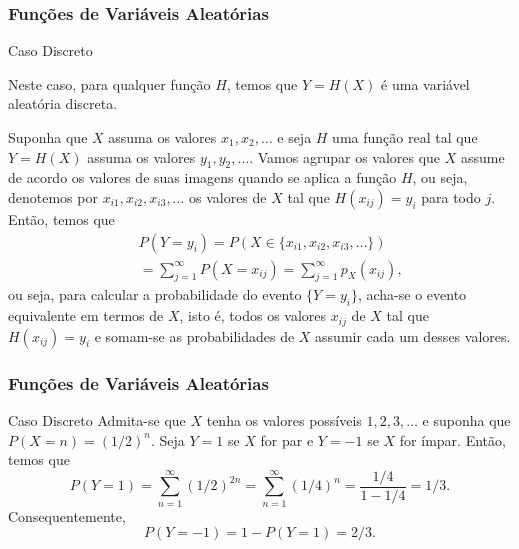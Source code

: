 \begin{frame}
\frametitle{\textbf{Funções de Variáveis Aleatórias}}
\baselineskip=13pt
\begin{block}{Caso Discreto}


Neste caso, para qualquer função
$H$, temos que $Y=H(X)$ é uma variável aleatória discreta.

Suponha que $X$ assuma os valores $x_1,x_2,\ldots$ e seja $H$ uma
função real tal que $Y=H(X)$ assuma os valores $y_1,y_2,\ldots$.
Vamos agrupar os valores que $X$ assume de acordo os valores de suas
imagens quando se aplica a função $H$, ou seja, denotemos por
$x_{i1},x_{i2},x_{i3},\ldots$ os valores de $X$ tal que
$H(x_{ij})=y_i$ para todo $j$. Então, temos que
\begin{eqnarray}
& & P(Y=y_i)=P(X\in\{x_{i1},x_{i2},x_{i3},\ldots\}) \nonumber\\
& & =\sum_{j=1}^{\infty}P(X=x_{ij})=\sum_{j=1}^{\infty}p_X(x_{ij}),\nonumber
\end{eqnarray}
ou seja, para calcular a probabilidade do evento $\{Y=y_i\}$,
acha-se o evento equivalente em termos de $X$, isto é, todos os
valores $x_{ij}$ de $X$ tal que $H(x_{ij})=y_i$ e somam-se as
probabilidades de $X$ assumir cada um desses valores.

\end{block}
\end{frame}

\begin{frame}
\frametitle{\textbf{Funções de Variáveis Aleatórias}}
\begin{exem}{Caso Discreto}
Admita-se que $X$ tenha os valores possíveis $1,2,3,\ldots$ e
suponha que $P(X=n)=(1/2)^n$. Seja $Y=1$ se $X$ for par e $Y=-1$ se
$X$ for ímpar. Então, temos que
$$P(Y=1)=\sum_{n=1}^{\infty}(1/2)^{2n}=\sum_{n=1}^{\infty}(1/4)^{n}=\frac{1/4}{1-1/4}=1/3.$$
Consequentemente,
$$P(Y=-1)=1-P(Y=1)=2/3.$$
\end{exem}
\end{frame}

